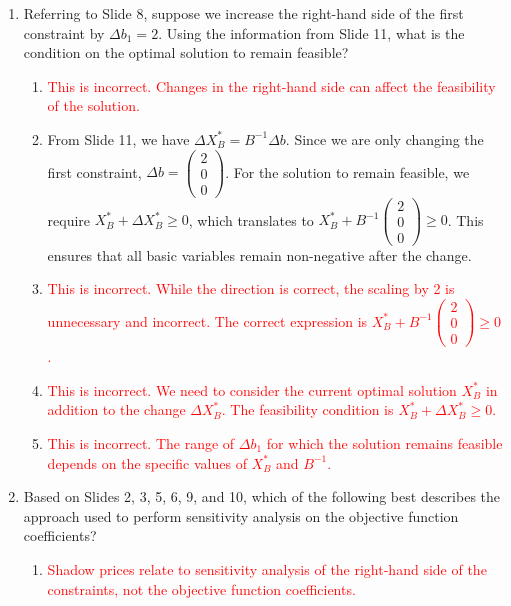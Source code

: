 \documentclass{article}%
\newcommand{\incorrect}[1]{\textcolor{red}{#1}}
\begin{document}
\begin{enumerate}
\begin{enumerate}
\end{enumerate}%
\vspace{1em}%
\item Referring to Slide 8, suppose we increase the right-hand side of the first constraint by $\Delta b_1 = 2$. Using the information from Slide 11, what is the condition on the optimal solution to remain feasible?%
\begin{enumerate}%
\item \incorrect{This is incorrect.  Changes in the right-hand side can affect the feasibility of the solution.}%
\item From Slide 11, we have $\Delta X_B^* = B^{-1} \Delta b$.  Since we are only changing the first constraint, $\Delta b = \begin{pmatrix} 2 \\ 0 \\ 0 \end{pmatrix}$.  For the solution to remain feasible, we require $X_B^* + \Delta X_B^* \ge 0$, which translates to $X_B^* + B^{-1} \begin{pmatrix} 2 \\ 0 \\ 0 \end{pmatrix} \ge 0$. This ensures that all basic variables remain non-negative after the change.%
\item \incorrect{This is incorrect. While the direction is correct, the scaling by 2 is unnecessary and incorrect. The correct expression is $X_B^* + B^{-1} \begin{pmatrix} 2 \\ 0 \\ 0 \end{pmatrix} \ge 0$.}%
\item \incorrect{This is incorrect.  We need to consider the current optimal solution $X_B^*$ in addition to the change $\Delta X_B^*$. The feasibility condition is $X_B^* + \Delta X_B^* \ge 0$.}%
\item \incorrect{This is incorrect.  The range of $\Delta b_1$ for which the solution remains feasible depends on the specific values of $X_B^*$ and $B^{-1}$.}%
\end{enumerate}%
\vspace{1em}%
\item Based on Slides 2, 3, 5, 6, 9, and 10, which of the following best describes the approach used to perform sensitivity analysis on the objective function coefficients?%
\begin{enumerate}%
\item \incorrect{Shadow prices relate to sensitivity analysis of the right-hand side of the constraints, not the objective function coefficients.}%

\end{enumerate}
\end{enumerate}
\end{document}
